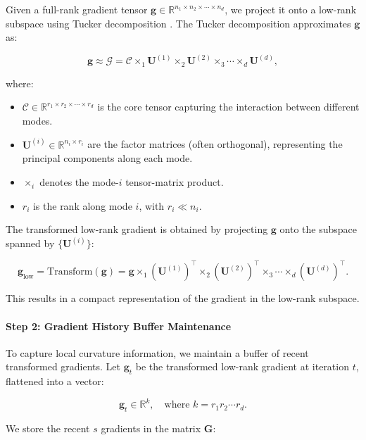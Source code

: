 Given a full-rank gradient tensor $\mathbf{g} \in \mathbb{R}^{n_1 \times n_2 \times \cdots \times n_d}$, we project it onto a low-rank subspace using Tucker decomposition \citep{tuckerMathematicalNotesThree1966}. The Tucker decomposition approximates $\mathbf{g}$ as:

\[
\mathbf{g} \approx \mathcal{G} = \mathcal{C} \times_1 \mathbf{U}^{(1)} \times_2 \mathbf{U}^{(2)} \times_3 \cdots \times_d \mathbf{U}^{(d)},
\]

where:

\begin{itemize}
    \item $\mathcal{C} \in \mathbb{R}^{r_1 \times r_2 \times \cdots \times r_d}$ is the core tensor capturing the interaction between different modes.
    \item $\mathbf{U}^{(i)} \in \mathbb{R}^{n_i \times r_i}$ are the factor matrices (often orthogonal), representing the principal components along each mode.
    \item $\times_i$ denotes the mode-$i$ tensor-matrix product.
    \item $r_i$ is the rank along mode $i$, with $r_i \ll n_i$.
\end{itemize}

The transformed low-rank gradient is obtained by projecting $\mathbf{g}$ onto the subspace spanned by $\{\mathbf{U}^{(i)}\}$:

\[
\mathbf{g}_{\text{low}} = \text{Transform}(\mathbf{g}) = \mathbf{g} \times_1 (\mathbf{U}^{(1)})^\top \times_2 (\mathbf{U}^{(2)})^\top \times_3 \cdots \times_d (\mathbf{U}^{(d)})^\top.
\]

This results in a compact representation of the gradient in the low-rank subspace.

\paragraph{Step 2: Gradient History Buffer Maintenance}



To capture local curvature information, we maintain a buffer of recent transformed gradients. Let $\mathbf{g}_t$ be the transformed low-rank gradient at iteration $t$, flattened into a vector:

\[
\mathbf{g}_t \in \mathbb{R}^{k}, \quad \text{where } k = r_1 r_2 \cdots r_d.
\]

We store the recent $s$ gradients in the matrix $\mathbf{G}$:

